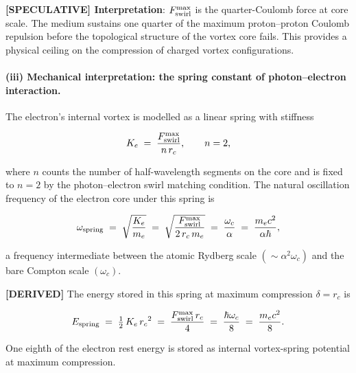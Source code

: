 \documentclass[11pt]{article}
\theoremstyle{definition}
\theoremstyle{plain}
\theoremstyle{remark}
\newcommand{\rc}{{r_c}}
\begin{document}
        \textbf{[SPECULATIVE] Interpretation}: $F_{\rm swirl}^{\max}$ is the quarter-Coulomb force at core scale. The medium sustains one quarter of the maximum proton--proton Coulomb repulsion before the topological structure of the vortex core fails. This provides a physical ceiling on the compression of charged vortex configurations.

        \paragraph{(iii) Mechanical interpretation: the spring constant of photon--electron interaction.}

        The electron's internal vortex is modelled as a linear spring with stiffness

        \begin{align}
            K_e \;=\; \frac{F_{\rm swirl}^{\max}}{n\,\rc},
            \qquad n = 2,
            \label{eq:spring_K}
        \end{align}

        where $n$ counts the number of half-wavelength segments on the core and is fixed to $n=2$ by the photon--electron swirl matching condition. The natural oscillation frequency of the electron core under this spring is

        \begin{align}
            \omega_{\rm spring}
            \;=\; \sqrt{\frac{K_e}{m_e}}
            \;=\; \sqrt{\frac{F_{\rm swirl}^{\max}}{2\,\rc\,m_e}}
            \;=\; \frac{\omega_c}{\alpha}
            \;=\; \frac{m_e c^2}{\alpha\hbar},
            \label{eq:omega_spring}
        \end{align}

        a frequency intermediate between the atomic Rydberg scale $(\sim\alpha^2\omega_c)$ and the bare Compton scale $(\omega_c)$.

        \textbf{[DERIVED]} The energy stored in this spring at maximum compression $\delta = \rc$ is

        \begin{align}
            E_{\rm spring}
            \;=\; \tfrac{1}{2}\,K_e\,\rc^2
            \;=\; \frac{F_{\rm swirl}^{\max}\,\rc}{4}
            \;=\; \frac{\hbar\omega_c}{8}
            \;=\; \frac{m_e c^2}{8}.
            \label{eq:Espring}
        \end{align}

        One eighth of the electron rest energy is stored as internal vortex-spring potential at maximum compression.
\end{document}

